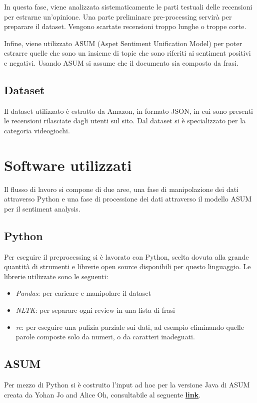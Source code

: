 \documentclass[a4paper,12pt]{article}
\begin{document}
\noindent In questa fase, viene analizzata sistematicamente le parti testuali delle recensioni per estrarne un’opinione.
Una parte preliminare pre-processing servirà per preparare il dataset. Vengono scartate recensioni troppo lunghe o troppe corte.

\noindent Infine, viene utilizzato ASUM (Aspet Sentiment Unification Model) per poter estrarre quelle che sono un insieme di topic che sono riferiti ai sentiment positivi e negativi. Usando ASUM si assume che il documento sia composto da frasi.
\bigskip

\subsection{Dataset}
Il dataset utilizzato è estratto da Amazon, in formato JSON, in cui sono presenti le recensioni rilasciate dagli utenti sul sito. Dal dataset si è specializzato per la categoria videogiochi.

\section{Software utilizzati}
Il flusso di lavoro si compone di due aree, una fase di manipolazione dei dati attraverso Python e una fase di processione dei dati attraverso il modello ASUM per il sentiment analysis.

\subsection{Python}
Per eseguire il preprocessing si è lavorato con Python, scelta dovuta alla
grande quantità di strumenti e librerie open source disponibili per questo linguaggio. Le librerie utilizzate sono le seguenti:
\begin{itemize}
	\item \textit{Pandas}: per caricare e manipolare il dataset
	\item \textit{NLTK}: per separare ogni review in una lista di frasi
	\item \textit{re}: per eseguire una pulizia parziale sui dati, ad esempio eliminando quelle parole composte solo da numeri, o da caratteri inadeguati.  
\end{itemize}

\subsection{ASUM}
Per mezzo di Python si è costruito l'input ad hoc per la versione Java di ASUM creata da Yohan Jo and Alice Oh, consultabile al seguente \href{http://www.cs.cmu.edu/~yohanj/research/WSDM11/index.html}{\textbf{link}}.
\end{document}
